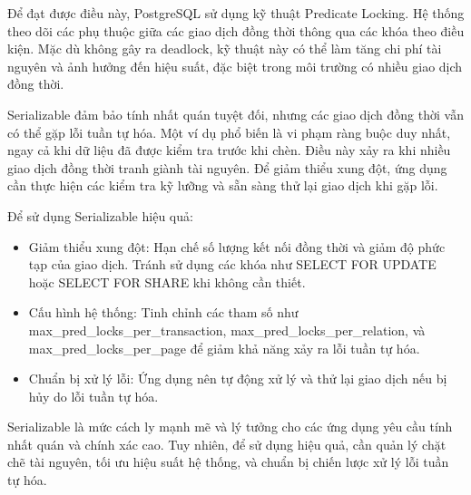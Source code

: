 \begin{enumerate}
    \hspace{1cm}Để đạt được điều này, PostgreSQL sử dụng kỹ thuật Predicate Locking. Hệ thống theo dõi các phụ thuộc giữa các giao dịch đồng thời thông qua các khóa theo điều kiện. Mặc dù không gây ra deadlock, kỹ thuật này có thể làm tăng chi phí tài nguyên và ảnh hưởng đến hiệu suất, đặc biệt trong môi trường có nhiều giao dịch đồng thời.

    \hspace{1cm}Serializable đảm bảo tính nhất quán tuyệt đối, nhưng các giao dịch đồng thời vẫn có thể gặp lỗi tuần tự hóa. Một ví dụ phổ biến là vi phạm ràng buộc duy nhất, ngay cả khi dữ liệu đã được kiểm tra trước khi chèn. Điều này xảy ra khi nhiều giao dịch đồng thời tranh giành tài nguyên. Để giảm thiểu xung đột, ứng dụng cần thực hiện các kiểm tra kỹ lưỡng và sẵn sàng thử lại giao dịch khi gặp lỗi.

    \hspace{1cm}Để sử dụng Serializable hiệu quả:
    \begin{itemize}
        \item Giảm thiểu xung đột: Hạn chế số lượng kết nối đồng thời và giảm độ phức tạp của giao dịch. Tránh sử dụng các khóa như SELECT FOR UPDATE hoặc SELECT FOR SHARE khi không cần thiết.
        \item Cấu hình hệ thống: Tinh chỉnh các tham số như max\_pred\_locks\_per\_transaction, max\_pred\_locks\_per\_relation, và max\_pred\_locks\_per\_page để giảm khả năng xảy ra lỗi tuần tự hóa.
        \item Chuẩn bị xử lý lỗi: Ứng dụng nên tự động xử lý và thử lại giao dịch nếu bị hủy do lỗi tuần tự hóa.
    \end{itemize}

    \hspace{1cm}Serializable là mức cách ly mạnh mẽ và lý tưởng cho các ứng dụng yêu cầu tính nhất quán và chính xác cao. Tuy nhiên, để sử dụng hiệu quả, cần quản lý chặt chẽ tài nguyên, tối ưu hiệu suất hệ thống, và chuẩn bị chiến lược xử lý lỗi tuần tự hóa.
\end{enumerate}

